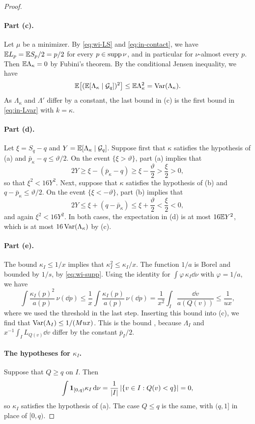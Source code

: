 \begin{proof}
\paragraph{Part (c).}
Let $\mu$ be a minimizer. By \eqref{eq:wi-LS} and \eqref{eq:in-contact},
we have $\mathbb E L_p=\mathbb E S_p/2=p/2$ for every $p\in\operatorname{supp}\nu$, and in
particular for $\nu$-almost every $p$. Then
$\mathbb E\Lambda_\kappa=0$ by Fubini's theorem. By the conditional Jensen
inequality, we have
\[
 \mathbb E\bigl[(\mathbb E[\Lambda_\kappa\mid\mathcal G_q])^2\bigr]
 \le\mathbb E\Lambda_\kappa^2=\operatorname{Var}(\Lambda_\kappa).
\]
As $\Lambda_\kappa$ and $\Lambda'$ differ by a constant, the last
bound in (c) is the first bound in \eqref{eq:in-Lvar} with $k=\kappa$.

\paragraph{Part (d).}
Let $\xi=S_q-q$ and $Y=\mathbb E[\Lambda_\kappa\mid\mathcal G_q]$. Suppose first
that $\kappa$ satisfies the hypothesis of (a) and
$\bar p_\kappa-q\le\vartheta/2$. On the event $\{\xi>\vartheta\}$, part
(a) implies that
\[
 2Y\ge\xi-(\bar p_\kappa-q)\ge\xi-\frac\vartheta2>\frac\xi2>0,
\]
so that $\xi^2<16Y^2$. Next, suppose that $\kappa$ satisfies the
hypothesis of (b) and $q-\bar p_\kappa\le\vartheta/2$. On the event
$\{\xi<-\vartheta\}$, part (b) implies that
\[
 2Y\le\xi+(q-\bar p_\kappa)\le\xi+\frac\vartheta2<\frac\xi2<0,
\]
and again $\xi^2<16Y^2$. In both cases, the expectation in (d) is at
most $16\mathbb E Y^2$, which is at most $16\operatorname{Var}(\Lambda_\kappa)$ by (c).

\paragraph{Part (e).}
The bound $\kappa_I\le1/x$ implies that $\kappa_I^2\le\kappa_I/x$. The function
$1/a$ is Borel and bounded by $1/s$, by \eqref{eq:wi-supp}. Using the
identity for $\int\varphi\,\kappa_I\dd\nu$ with $\varphi=1/a$, we have
\[
 \int\frac{\kappa_I(p)^2}{a(p)}\,\nu(\dd p)
 \le\frac1x\int\frac{\kappa_I(p)}{a(p)}\,\nu(\dd p)
 =\frac1{x^2}\int_I\frac{\dd v}{a(Q(v))}
 \le\frac1{ux},
\]
where we used the threshold in the last step. Inserting this bound into (c),
we find that $\operatorname{Var}(\Lambda_I)\le1/(Mux)$. This is the bound
\cite[Section~3, (3.6)]{AL}, because $\Lambda_I$ and
$x^{-1}\int_IL_{Q(v)}\dd v$ differ by the constant $\bar p_I/2$.

\paragraph{The hypotheses for $\kappa_I$.}
Suppose that $Q\ge q$ on $I$. Then
\[
 \int\mathbf1_{[0,q)}\kappa_I\,\mathrm d\nu=\frac1{|I|}\,|\{v\in I:Q(v)<q\}|=0,
\]
so $\kappa_I$ satisfies the hypothesis of (a). The case $Q\le q$ is the
same, with $(q,1]$ in place of $[0,q)$.
\end{proof}

